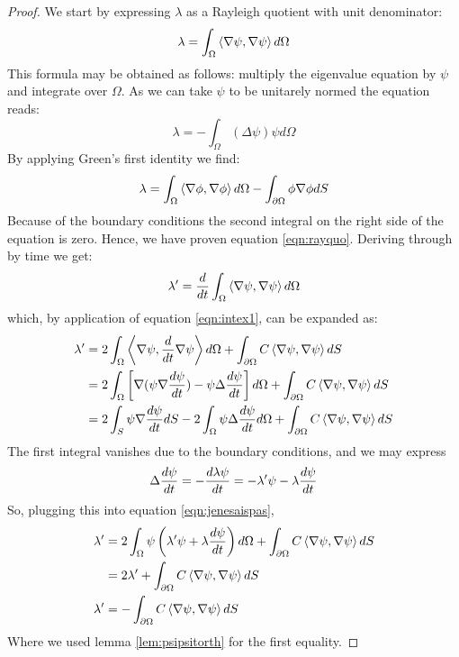 \documentclass[../main.tex]{subfiles}
\begin{document}
		\begin{proof}
			We start by expressing $ \lambda $ as a Rayleigh quotient with unit denominator:
			\begin{gather}
				\label{eqn:rayquo}
			\lambda=\int_{\Omega}\left<\nabla\psi,\nabla\psi\right>d\Omega
			\end{gather}
			This formula may be obtained as follows: multiply the eigenvalue equation by $ \psi $ and integrate over $ \Omega $. As we can take $ \psi $ to be unitarely normed the equation reads:
			\begin{equation}
				\lambda=-\int_{\Omega}(\Delta\psi)\psi d\Omega
			\end{equation}
			By applying Green's first identity we find:
			\begin{gather}
				\lambda=\int_{\Omega}\left<\nabla\phi,\nabla\phi\right>d\Omega-\int_{\partial \Omega}\phi\nabla\phi dS
			\end{gather}
			Because of the boundary conditions the second integral on the right side of the equation is zero. Hence, we have proven equation \ref{eqn:rayquo}.
			Deriving through by time we get:
			\begin{gather}
			\lambda'=\dfrac{d}{dt}\int_{\Omega}\left<\nabla\psi,\nabla\psi\right>d\Omega
			\end{gather}
			which, by application of equation \ref{eqn:intex1}, can be expanded as:
			\begin{align}
			\lambda'&=2\int_{\Omega}\left<\nabla\psi,\dfrac{d}{dt}\nabla\psi\right>d\Omega+\int_{\partial\Omega}C\left<\nabla\psi,\nabla\psi\right>dS \\
					&=2\int_{\Omega}\left[\nabla(\psi\nabla\dfrac{d\psi}{dt})-\psi\Delta\dfrac{d\psi}{dt} \right]d\Omega+\int_{\partial\Omega}C\left<\nabla\psi,\nabla\psi\right>dS \\
					&=2\int_{S}\psi\nabla\dfrac{d\psi}{dt} dS-2\int_{\Omega}\psi\Delta\dfrac{d\psi}{dt} d\Omega+\int_{\partial\Omega}C\left<\nabla\psi,\nabla\psi\right>dS\label{eqn:jenesaispas}
			\end{align}
			The first integral vanishes due to the boundary conditions, and we may express
			\begin{gather}
				\Delta\dfrac{d\psi}{dt}=-\dfrac{d\lambda\psi}{dt}=-\lambda'\psi-\lambda\dfrac{d\psi}{dt}
			\end{gather}
			So, plugging this into equation \ref{eqn:jenesaispas},
			\begin{align}
			\lambda'&=2\int_{\Omega}\psi\left(\lambda'\psi+\lambda\dfrac{d\psi}{dt}\right)d\Omega+\int_{\partial\Omega}C\left<\nabla\psi,\nabla\psi\right>dS\\
			&=2\lambda'+\int_{\partial\Omega}C\left<\nabla\psi,\nabla\psi\right>dS\\
			\lambda'&=-\int_{\partial\Omega}C\left<\nabla\psi,\nabla\psi\right>dS
			\end{align}
			Where we used lemma \ref{lem:psipsitorth} for the first equality.
		\end{proof}
\end{document}

